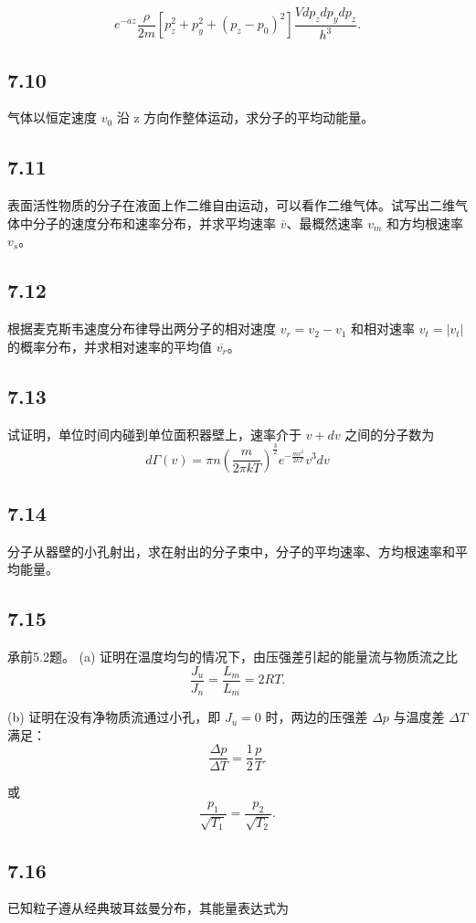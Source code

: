 $$e^{-a z} \frac{\rho}{2m} \left[ p_z^2 + p_y^2 + (p_z - p_0)^2 \right] \frac{Vdp_z dp_y dp_z}{h^3}.$$

\newpage
\subsection{7.10}
气体以恒定速度 $ v_{0} $ 沿 z 方向作整体运动，求分子的平均动能量。

\newpage
\subsection{7.11}
表面活性物质的分子在液面上作二维自由运动，可以看作二维气体。试写出二维气体中分子的速度分布和速率分布，并求平均速率 $\overline{v}$、最概然速率 $v_m$ 和方均根速率 $v_s$。

\newpage
\subsection{7.12}
根据麦克斯韦速度分布律导出两分子的相对速度 $ v_r = v_2 - v_1 $ 和相对速率 $ v_t = |v_t| $ 的概率分布，并求相对速率的平均值 $ \overline{v_r} $。

\newpage
\subsection{7.13}
试证明，单位时间内碰到单位面积器壁上，速率介于 $v + dv$ 之间的分子数为
$$ d\Gamma (v) = \pi n \left( \frac{m}{2\pi kT} \right)^{\frac{3}{2}} e^{-\frac{mv^2}{2kT}} v^3 dv $$

\newpage
\subsection{7.14}
分子从器壁的小孔射出，求在射出的分子束中，分子的平均速率、方均根速率和平均能量。

\newpage
\subsection{7.15}
承前5.2题。
(a) 证明在温度均匀的情况下，由压强差引起的能量流与物质流之比
$$\frac{J_u}{J_n} = \frac{L_m}{L_m} = 2RT.$$

(b) 证明在没有净物质流通过小孔，即 $J_u = 0$ 时，两边的压强差 $\Delta p$ 与温度差 $\Delta T$ 满足：
$$\frac{\Delta p}{\Delta T} = \frac{1}{2} \frac{p}{T}.$$

或
$$\frac{p_1}{\sqrt{T_1}} = \frac{p_2}{\sqrt{T_2}}.$$

\newpage
\subsection{7.16}
已知粒子遵从经典玻耳兹曼分布，其能量表达式为

